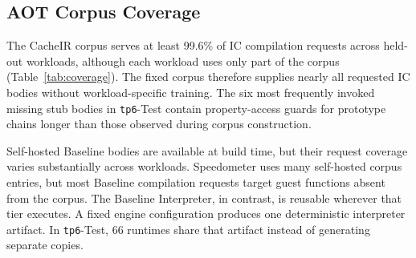 \documentclass[sigplan,screen,review,anonymous]{acmart}
\newcommand{\sptrichitrate}{99.6\%}
\begin{document}
\subsection{AOT Corpus Coverage}

The CacheIR corpus serves at least \sptrichitrate{} of IC compilation requests across held-out workloads, although each workload uses only part of the corpus (Table~\ref{tab:coverage}). The fixed corpus therefore supplies nearly all requested IC bodies without workload-specific training. The six most frequently invoked missing stub bodies in {\tt tp6}-Test contain property-access guards for prototype chains longer than those observed during corpus construction.

Self-hosted Baseline bodies are available at build time, but their request coverage varies substantially across workloads. Speedometer uses many self-hosted corpus entries, but most Baseline compilation requests target guest functions absent from the corpus. The Baseline Interpreter, in contrast, is reusable wherever that tier executes. A fixed engine configuration produces one deterministic interpreter artifact. In {\tt tp6}-Test, 66 runtimes share that artifact instead of generating separate copies.
\end{document}
